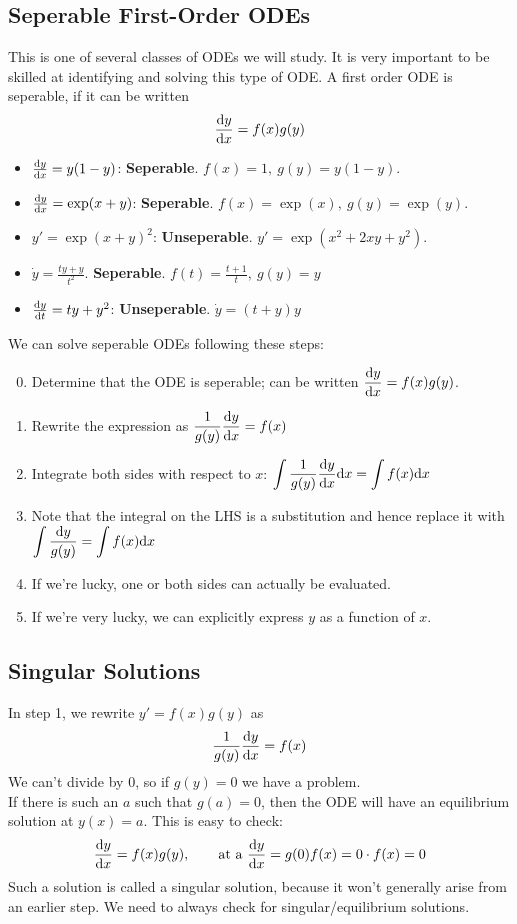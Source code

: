\documentclass{report}
\begin{document}
\subsection*{Seperable First-Order ODEs}
This is one of several classes of ODEs we will study. It is very important to be skilled at identifying and solving this type of ODE. A first order ODE is seperable, if it can be written
$$
	\frac{\mathrm{d} y}{\mathrm{d} x} = f(x) g(y)
$$
\begin{itemize}
	\item $\frac{\mathrm{d} y}{\mathrm{d} x} = y(1-y)$: \textbf{Seperable}. $f(x) = 1,\ g(y) = y(1-y)$.
	\item $\frac{\mathrm{d} y}{\mathrm{d} x} = \exp(x+y)$: \textbf{Seperable}. $f(x)=\exp(x),\ g(y)=\exp(y)$.
	\item $y' = \exp(x+y)^2$: \textbf{Unseperable}. $y' = \exp(x^2 + 2xy + y^2)$.
	\item $\dot{y} = \frac{ty + y}{t^2}$. \textbf{Seperable}. $f(t) = \frac{t+1}{t},\ g(y) = y$
	\item $\frac{\mathrm{d} y}{\mathrm{d} t} = ty + y^2$: \textbf{Unseperable}. $\dot{y}=(t+y)y$
\end{itemize}
We can solve seperable ODEs following these steps:
\begin{enumerate}
	\setcounter{enumi}{-1}
	\item Determine that the ODE is seperable; can be written $\displaystyle{\frac{\mathrm{d}y}{\mathrm{d}x}= f(x)g(y)}$.
	\item Rewrite the expression as $\displaystyle{\frac{1}{g(y)}\frac{\mathrm{d}y}{\mathrm{d}x}= f(x)}$
	\item Integrate both sides with respect to $x$: $\displaystyle{\int\frac{1}{g(y)}\frac{\mathrm{d}y}{\mathrm{d}x}\mathrm{d}x = \int f(x)\mathrm{d}x}$
	\item Note that the integral on the LHS is a substitution and hence replace it with $\displaystyle{\int\frac{\mathrm{d}y}{g(y)} = \int f(x)\mathrm{d}x}$
	\item If we're lucky, one or both sides can actually be evaluated.
	\item If we're very lucky, we can explicitly express $y$ as a function of $x$. 
\end{enumerate}

\subsection*{Singular Solutions}
In step 1, we rewrite $y' = f(x)g(y)$ as 
$$
	\frac{1}{g(y)}\frac{\mathrm{d} y}{\mathrm{d} x} = f(x)
$$
We can't divide by 0, so if $g(y)=0$ we have a problem. \\

If there is such an $a$ such that $g(a)=0$, then the ODE will have an equilibrium solution at $y(x)=a$. This is easy to check:
$$
	\frac{\mathrm{d} y}{\mathrm{d} x} = f(x)g(y),\qquad \text{at a}\ \frac{\mathrm{d} y}{\mathrm{d} x} = g(0)f(x) = 0\cdot f(x) = 0
$$
Such a solution is called a singular solution, because it won't generally arise from an earlier step. We need to always check for singular/equilibrium solutions.
\end{document}
